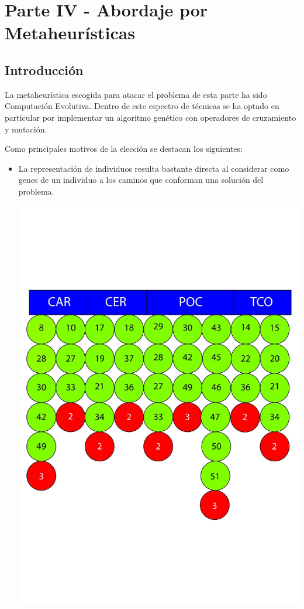 \documentclass{extarticle}
\newcommand{\squeezeup}{\vspace{-5.0mm}}
\begin{document}
\section{Parte IV - Abordaje por Metaheurísticas}
\subsection{Introducción}
La metaheurística escogida para atacar el problema de esta parte ha sido Computación Evolutiva. Dentro de este espectro de técnicas se ha optado en particular por implementar un algoritmo genético con operadores de cruzamiento y mutación.

Como principales motivos de la elección se destacan los siguientes:
\begin{itemize}
	\item La representación de individuos resulta bastante directa al considerar como genes de un individuo a los caminos que conforman una solución del problema.
	\squeezeup
	\begin{center}
		\includegraphics[scale=0.1]{img/genindividuo.jpeg}

\end{center}
\end{itemize}
\end{document}
